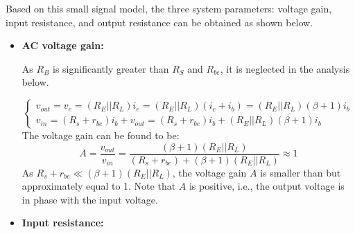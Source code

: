 \documentclass{article}
\begin{document}
Based on this small signal model, the three system parameters: 
voltage gain, input resistance, and output resistance can be 
obtained as shown below.

\begin{itemize}
\item {\bf AC voltage gain:} 

  As $R_B$ is significantly greater than $R_S$ and $R_{be}$, it is
  neglected in the analysis below.


  \begin{equation}
  \left\{ \begin{array}{l} 
    v_{out}=v_e=(R_E||R_L)i_e =(R_E||R_L)(i_c+i_b)=(R_E||R_L)(\beta+1) i_b 	\\
    v_{in}=(R_s+r_{be})i_b +v_{out}=(R_s+r_{be})i_b+(R_E||R_L)(\beta+1) i_b 
  \end{array} \right. 
  \end{equation}
  The voltage gain can be found to be:
  \begin{equation}
  A=\frac{v_{out}}{v_{in}}
  =\frac{(\beta+1) (R_E||R_L)}{(R_s+r_{be})+(\beta+1) (R_E||R_L)} \approx 1 
  \end{equation}
  As $R_s+r_{be} \ll (\beta+1) (R_E||R_L)$, the voltage gain $A$ is smaller 
  than but approximately equal to 1. Note that $A$ is positive, i.e., the 
  output voltage is in phase with the input voltage.

\item {\bf Input resistance:} 


\end{itemize}
\end{document}
